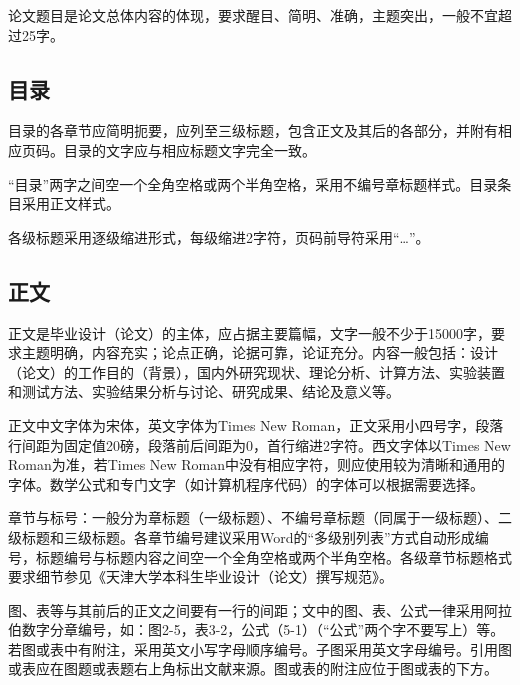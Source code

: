 论文题目是论文总体内容的体现，要求醒目、简明、准确，主题突出，一般不宜超过25字。

\subsection{目录}
目录的各章节应简明扼要，应列至三级标题，包含正文及其后的各部分，并附有相应页码。目录的文字应与相应标题文字完全一致。

“目录”两字之间空一个全角空格或两个半角空格，采用不编号章标题样式。目录条目采用正文样式。

各级标题采用逐级缩进形式，每级缩进2字符，页码前导符采用“…”。

\subsection{正文}
正文是毕业设计（论文）的主体，应占据主要篇幅，文字一般不少于15000字，要求主题明确，内容充实；论点正确，论据可靠，论证充分。内容一般包括：设计（论文）的工作目的（背景），国内外研究现状、理论分析、计算方法、实验装置和测试方法、实验结果分析与讨论、研究成果、结论及意义等。

正文中文字体为宋体，英文字体为Times New Roman，正文采用小四号字，段落行间距为固定值20磅，段落前后间距为0，首行缩进2字符。西文字体以Times New Roman为准，若Times New Roman中没有相应字符，则应使用较为清晰和通用的字体。数学公式和专门文字（如计算机程序代码）的字体可以根据需要选择。

章节与标号：一般分为章标题（一级标题）、不编号章标题（同属于一级标题）、二级标题和三级标题。各章节编号建议采用Word的“多级别列表”方式自动形成编号，标题编号与标题内容之间空一个全角空格或两个半角空格。各级章节标题格式要求细节参见《天津大学本科生毕业设计（论文）撰写规范》。

图、表等与其前后的正文之间要有一行的间距；文中的图、表、公式一律采用阿拉伯数字分章编号，如：图2-5，表3-2，公式（5-1）（“公式”两个字不要写上）等。若图或表中有附注，采用英文小写字母顺序编号。子图采用英文字母编号。引用图或表应在图题或表题右上角标出文献来源。图或表的附注应位于图或表的下方。

